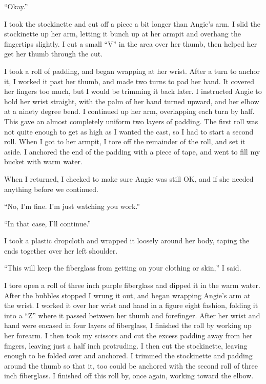 ``Okay.''

I took the stockinette and cut off a piece a bit longer than Angie's arm. I slid the stockinette
up her arm, letting it bunch up at her armpit and overhang the fingertips slightly. I cut a
small ``V'' in the area over her thumb, then helped her get her thumb through the cut.

I took a roll of padding, and began wrapping at her wrist. After a turn to anchor it, I worked
it past her thumb, and made two turns to pad her hand. It covered her fingers too much, but I
would be trimming it back later. I instructed Angie to hold her wrist straight, with the palm of
her hand turned upward, and her elbow at a ninety degree bend. I continued up her arm,
overlapping each turn by half. This gave an almost completely uniform two layers of padding. The
first roll was not quite enough to get as high as I wanted the cast, so I had to start a second
roll. When I got to her armpit, I tore off the remainder of the roll, and set it aside. I
anchored the end of the padding with a piece of tape, and went to fill my bucket with warm
water.

When I returned, I checked to make sure Angie was still OK, and if she needed anything before we
continued.

``No, I'm fine. I'm just watching you work.''

``In that case, I'll continue.''

I took a plastic dropcloth and wrapped it loosely around her body, taping the ends together over
her left shoulder.

``This will keep the fiberglass from getting on your clothing or skin,'' I said.

I tore open a roll of three inch purple fiberglass and dipped it in the warm water. After the
bubbles stopped I wrung it out, and began wrapping Angie's arm at the wrist. I worked it over
her wrist and hand in a figure eight fashion, folding it into a ``Z'' where it passed between
her thumb and forefinger. After her wrist and hand were encased in four layers of fiberglass, I
finished the roll by working up her forearm. I then took my scissors and cut the excess padding
away from her fingers, leaving just a half inch protruding. I then cut the stockinette, leaving
enough to be folded over and anchored. I trimmed the stockinette and padding around the thumb so
that it, too could be anchored with the second roll of three inch fiberglass. I finished off
this roll by, once again, working toward the elbow.

